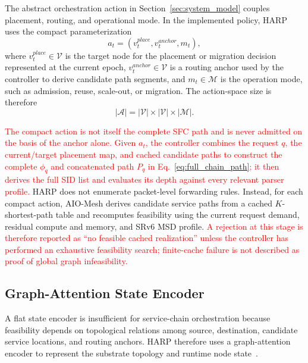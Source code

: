 \documentclass[final,5p]{elsarticle}
\newcommand{\rev}[1]{\textcolor{red}{#1}}
\begin{document}
The abstract orchestration action in Section~\ref{sec:system_model} couples placement, routing, and operational mode. In the implemented policy, HARP uses the compact parameterization
\begin{equation}
    a_t=(v_t^{place},v_t^{anchor},m_t),
\end{equation}
where \(v_t^{place}\in\mathcal{V}\) is the target node for the placement or migration decision represented at the current epoch, \(v_t^{anchor}\in\mathcal{V}\) is a routing anchor used by the controller to derive candidate path segments, and \(m_t\in\mathcal{M}\) is the operation mode, such as admission, reuse, scale-out, or migration. The action-space size is therefore
\begin{equation}
    |\mathcal{A}|=|\mathcal{V}|\times|\mathcal{V}|\times|\mathcal{M}|.
\end{equation}

\rev{The compact action is not itself the complete SFC path and is never admitted on the basis of the anchor alone. Given \(a_t\), the controller combines the request \(q\), the current/target placement map, and cached candidate paths to construct the complete \(\phi_q\) and concatenated path \(P_q\) in Eq.~\eqref{eq:full_chain_path}; it then derives the full SID list and evaluates its depth against every relevant parser profile.} HARP does not enumerate packet-level forwarding rules. Instead, for each compact action, AIO-Mesh derives candidate service paths from a cached \(K\)-shortest-path table and recomputes feasibility using the current request demand, residual compute and memory, and SRv6 MSD profile. \rev{A rejection at this stage is therefore reported as ``no feasible cached realization'' unless the controller has performed an exhaustive feasibility search; finite-cache failure is not described as proof of global graph infeasibility.}

\subsection{Graph-Attention State Encoder}
\label{subsec:harp_gat}

A flat state encoder is insufficient for service-chain orchestration because feasibility depends on topological relations among source, destination, candidate service locations, and routing anchors. HARP therefore uses a graph-attention encoder to represent the substrate topology and runtime node state~\cite{velickovic2018graph}.
\end{document}
